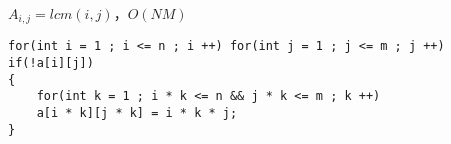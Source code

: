 \documentclass[E:/GsjzTle/main/main.tex]{subfiles}
\begin{document}
\(A_{i,j}=lcm(i,j)\)，\(O(NM)\)

\begin{lstlisting}
for(int i = 1 ; i <= n ; i ++) for(int j = 1 ; j <= m ; j ++)
if(!a[i][j])
{
	for(int k = 1 ; i * k <= n && j * k <= m ; k ++) 
	a[i * k][j * k] = i * k * j;
}
\end{lstlisting}
\end{document}
